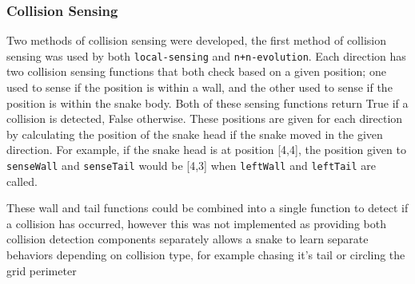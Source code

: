 \subsubsection{Collision Sensing}
Two methods of collision sensing were developed, the first method of collision sensing was used by both \verb|local-sensing| and \verb|n+n-evolution|. Each direction has two collision sensing functions that both check based on a given position; one used to sense if the position is within a wall, and the other used to sense if the position is within the snake body. Both of these sensing functions return True if a collision is detected, False otherwise. These positions are given for each direction by calculating the position of the snake head if the snake moved in the given direction. For example, if the snake head is at position [4,4], the position given to \verb|senseWall| and \verb|senseTail| would be [4,3] when \verb|leftWall| and \verb|leftTail| are called. 

These wall and tail functions could be combined into a single function to detect if a collision has occurred, however this was not implemented as providing both collision detection components separately allows a snake to learn separate behaviors depending on collision type, for example chasing it's tail or circling the grid perimeter

